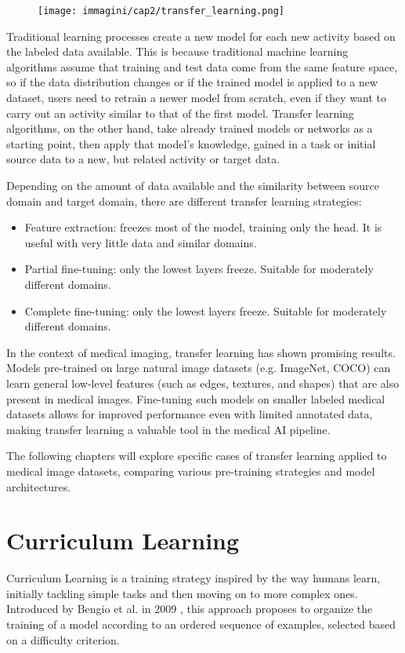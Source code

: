 \begin{figure}[!ht]
    \centering
    \texttt{[image: immagini/cap2/transfer\_learning.png]}
    \caption{}
    \label{fig:transfer_learning}
\end{figure}
Traditional learning processes create a new model for each new activity based on the labeled data available. This is because traditional machine learning algorithms assume that training and test data come from the same feature space, so if the data distribution changes or if the trained model is applied to a new dataset, users need to retrain a newer model from scratch, even if they want to carry out an activity similar to that of the first model. Transfer learning algorithms, on the other hand, take already trained models or networks as a starting point, then apply that model's knowledge, gained in a task or initial source data to a new, but related activity or target data.

Depending on the amount of data available and the similarity between source domain and target domain, there are different transfer learning strategies:

\begin{itemize}
    \item{Feature extraction}: freezes most of the model, training only the head. It is useful with very little data and similar domains.
    \item{Partial fine-tuning}: only the lowest layers freeze. Suitable for moderately different domains.
    \item {Complete fine-tuning}: only the lowest layers freeze. Suitable for moderately different domains.
\end{itemize}
In the context of medical imaging, transfer learning has shown promising results. Models pre-trained on large natural image datasets (e.g. ImageNet, COCO) can learn general low-level features (such as edges, textures, and shapes) that are also present in medical images. Fine-tuning such models on smaller labeled medical datasets allows for improved performance even with limited annotated data, making transfer learning a valuable tool in the medical AI pipeline.

The following chapters will explore specific cases of transfer learning applied to medical image datasets, comparing various pre-training strategies and model architectures.

\section{Curriculum Learning}
Curriculum Learning is a training strategy inspired by the way humans learn, initially tackling simple tasks and then moving on to more complex ones. Introduced by Bengio et al. in 2009 \cite{bengio2009curriculum}, this approach proposes to organize the training of a model according to an ordered sequence of examples, selected based on a difficulty criterion.

